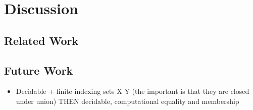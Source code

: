 \documentclass[sigplan,10pt,anonymous,review]{acmart}%
\begin{document}
\section{Discussion}
\subsection{Related Work}
\subsection{Future Work}
\begin{itemize}
  \item Decidable + finite indexing sets X Y (the important is that they are closed under union) THEN decidable, computational equality and membership
\end{itemize}







\appendix
\end{document}
